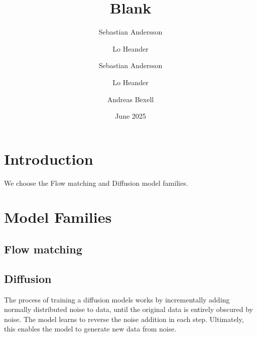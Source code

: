\documentclass{article}
\title{Blank}
\author{Sebastian Andersson}
\author{Lo Heander}
\author{Sebastian Andersson \and Lo Heander \and Andreas Bexell}
\date{June 2025}
\begin{document}
\maketitle

\section{Introduction}

We choose the Flow matching and Diffusion model families. 

\section{Model Families}

\subsection{Flow matching}

\subsection{Diffusion}

The process of training a diffusion models works by incrementally adding normally distributed noise to data, until the original data is entirely obscured by noise.
The model learns to reverse the noise addition in each step. Ultimately, this enables the model to generate new data from noise.
\end{document}
